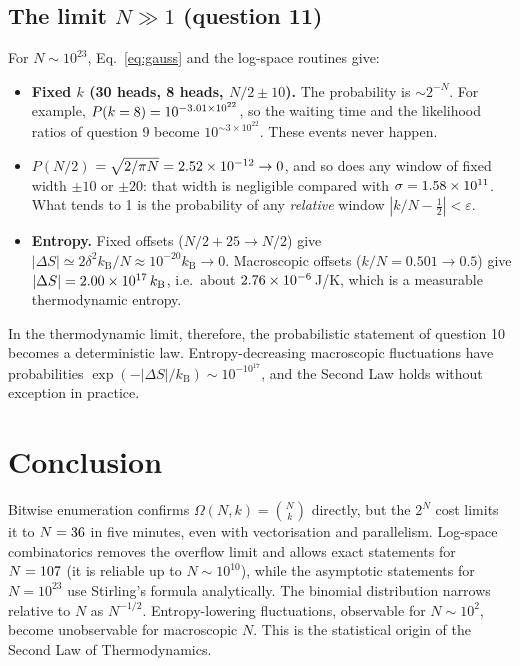 \documentclass[11pt, a4paper]{article}
\newcommand{\kB}{k_{\mathrm{B}}}
\begin{document}
\subsection{The limit $N\gg1$ (question 11)}
For $N\sim10^{23}$, Eq.~\eqref{eq:gauss} and the log-space routines give:
\begin{itemize}
\item \textbf{Fixed $k$ (30 heads, 8 heads, $N/2\pm10$).} The probability is $\sim2^{-N}$. For example, $P(k=8)=10^{-3.01\times10^{22}}$, so the waiting time and the likelihood ratios of question 9 become $10^{\sim3\times10^{22}}$. These events never happen.
\item \textbf{$P(N/2)$} $=\sqrt{2/\pi N}=2.52\times10^{-12}\to0$, and so does any window of fixed width $\pm10$ or $\pm20$: that width is negligible compared with $\sigma=1.58\times10^{11}$. What tends to 1 is the probability of any \emph{relative} window $|k/N-\tfrac12|<\varepsilon$.
\item \textbf{Entropy.} Fixed offsets ($N/2+25\to N/2$) give $|\Delta S|\simeq2\delta^2\kB/N\approx10^{-20}\kB\to0$. Macroscopic offsets ($k/N=0.501\to0.5$) give $|\Delta S|=\TLdSkB\,\kB$, i.e.\ about $2.76\times10^{-6}$\,J/K, which is a measurable thermodynamic entropy.
\end{itemize}
In the thermodynamic limit, therefore, the probabilistic statement of question 10 becomes a deterministic law. Entropy-decreasing macroscopic fluctuations have probabilities $\exp(-|\Delta S|/\kB)\sim10^{-10^{17}}$, and the Second Law holds without exception in practice.

\section{Conclusion}
Bitwise enumeration confirms $\Omega(N,k)=\binom Nk$ directly, but the $2^N$ cost limits it to $N=36$ in five minutes, even with vectorisation and parallelism. Log-space combinatorics removes the overflow limit and allows exact statements for $N=107$ (it is reliable up to $N\sim10^{10}$), while the asymptotic statements for $N=10^{23}$ use Stirling's formula analytically. The binomial distribution narrows relative to $N$ as $N^{-1/2}$. Entropy-lowering fluctuations, observable for $N\sim10^2$, become unobservable for macroscopic $N$. This is the statistical origin of the Second Law of Thermodynamics.

\appendix
\end{document}
